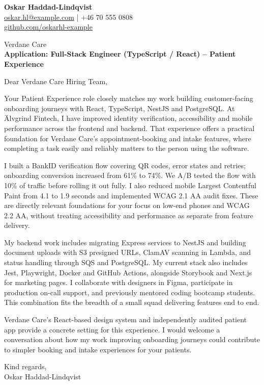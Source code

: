 \documentclass[11pt,a4paper]{article}
\begin{document}
{\Large\bfseries\color{primarycolor} Oskar Haddad-Lindqvist}\\
\href{mailto:oskar.hl@example.com}{oskar.hl@example.com} | +46 70 555 0808\\
\href{https://github.com/oskarhl-example}{github.com/oskarhl-example}

Verdane Care\\
\textbf{Application: Full-Stack Engineer (TypeScript / React) – Patient Experience}

Dear Verdane Care Hiring Team,

Your Patient Experience role closely matches my work building customer-facing onboarding journeys with React, TypeScript, NestJS and PostgreSQL. At Älvgrind Fintech, I have improved identity verification, accessibility and mobile performance across the frontend and backend. That experience offers a practical foundation for Verdane Care's appointment-booking and intake features, where completing a task easily and reliably matters to the person using the software.

I built a BankID verification flow covering QR codes, error states and retries; onboarding conversion increased from 61\% to 74\%. We A/B tested the flow with 10\% of traffic before rolling it out fully. I also reduced mobile Largest Contentful Paint from 4.1 to 1.9 seconds and implemented WCAG 2.1 AA audit fixes. These are directly relevant foundations for your focus on low-end phones and WCAG 2.2 AA, without treating accessibility and performance as separate from feature delivery.

My backend work includes migrating Express services to NestJS and building document uploads with S3 presigned URLs, ClamAV scanning in Lambda, and status handling through SQS and PostgreSQL. My current stack also includes Jest, Playwright, Docker and GitHub Actions, alongside Storybook and Next.js for marketing pages. I collaborate with designers in Figma, participate in production on-call support, and previously mentored coding bootcamp students. This combination fits the breadth of a small squad delivering features end to end.

Verdane Care's React-based design system and independently audited patient app provide a concrete setting for this experience. I would welcome a conversation about how my work improving onboarding journeys could contribute to simpler booking and intake experiences for your patients.

Kind regards,\\
Oskar Haddad-Lindqvist
\end{document}
